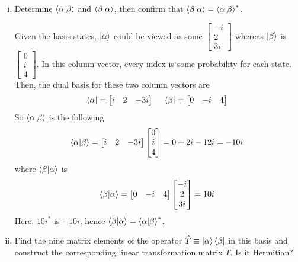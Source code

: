 \documentclass[10pt,letterpaper]{article}
\begin{document}
\begin{enumerate}
\begin{enumerate}[a)]
\begin{enumerate}[i)]
\color{violet}
The dual basis of $\bra{\alpha}$ is
$$\bra{\alpha} = i\bra{0} + 2\bra{1} - 3i\bra{2}$$
and the dual basis of $\bra{\beta}$ is
$$\bra{\beta} = -i\bra{1} + 4\bra{2}$$
\color{black}

\item Determine $\braket{\alpha | \beta}$ and $\braket{\beta | \alpha}$, then confirm that $\braket{\beta | \alpha} = \braket{\alpha | \beta}^{*}$.

\color{violet}
Given the basis states, $\ket{\alpha}$ could be viewed as some $\begin{bmatrix}
-i \\
2 \\
3i
\end{bmatrix}$ whereas $\ket{\beta}$ is $\begin{bmatrix}
0 \\
i \\
4
\end{bmatrix}$. In this column vector, every index is some probability for each state. Then, the dual basis for these two column vectors are
$$\bra{\alpha} = \begin{bmatrix}
i & 2 & -3i
\end{bmatrix}\ \ \ \ \bra{\beta} = \begin{bmatrix}
0 & -i & 4
\end{bmatrix}$$
So $\braket{\alpha | \beta}$ is the following
$$\braket{\alpha | \beta} = \begin{bmatrix}
i & 2 & -3i
\end{bmatrix}\begin{bmatrix}
0 \\
i \\
4 
\end{bmatrix} = 0 + 2i - 12i = -10i$$
where $\braket{\beta | \alpha}$ is
$$\braket{\beta | \alpha} = \begin{bmatrix}
0 & -i & 4
\end{bmatrix}\begin{bmatrix}
-i \\
2 \\
3i
\end{bmatrix} = 10i$$
Here, $10i^{*}$ is $-10i$, hence $\braket{\beta | \alpha} = \braket{\alpha | \beta}^{*}$.
\color{black}

\item Find the nine matrix elements of the operator $\hat{T} \equiv \ket{\alpha}\bra{\beta}$ in this basis and construct the corresponding linear transformation matrix $T$. Is it Hermitian?


\end{enumerate}
\end{enumerate}
\end{enumerate}
\end{document}

